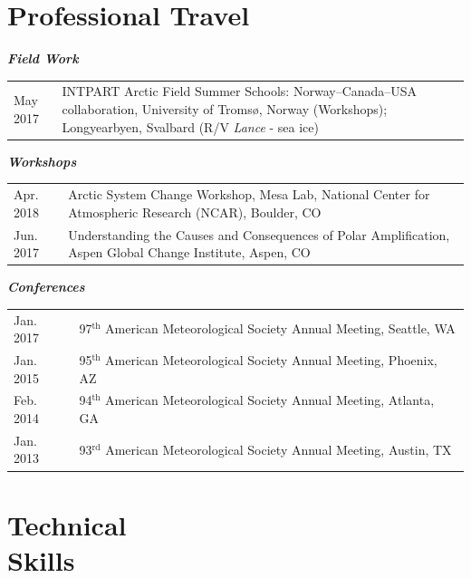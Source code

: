 \documentclass[margin,line,palatino,courier,10pt]{res}
\begin{document}
\begin{resume}
\section{\sc \textcolor{Cerulean}{\large{\textbf{Professional Travel}}}}
\textit{\textbf{Field Work}}
\vspace*{0.05in}\\
\begin{tabular}{@{}p{0.9in}p{4in}}
May 2017 & INTPART Arctic Field Summer Schools: Norway--Canada--USA collaboration, University of Troms\o, Norway (Workshops); Longyearbyen, Svalbard (R/V \textit{Lance} - sea ice)
\end{tabular}

\newpage
\textit{\textbf{Workshops}}
\vspace*{0.05in}\\
\begin{tabular}{@{}p{0.9in}p{4in}}
Apr. 2018 & Arctic System Change Workshop, Mesa Lab, National Center for Atmospheric Research (NCAR), Boulder, CO\\
Jun. 2017 & Understanding the Causes and Consequences of Polar Amplification, Aspen Global Change Institute, Aspen, CO
\end{tabular}

\textit{\textbf{Conferences}}
\vspace*{0.05in}\\
\begin{tabular}{@{}p{0.9in}p{4in}}
Jan. 2017 & 97$^\text{th} $ American Meteorological Society Annual Meeting, Seattle, WA \\
Jan. 2015 & 95$^\text{th} $ American Meteorological Society Annual Meeting, Phoenix, AZ \\
Feb. 2014 & 94$^\text{th} $ American Meteorological Society Annual Meeting, Atlanta, GA \\
Jan. 2013 & 93$^\text{rd} $ American Meteorological Society Annual Meeting, Austin, TX \\
\end{tabular}

\section{\sc \textcolor{Cerulean}{\large{\textbf{Technical \\ Skills}}}}
\vspace*{0.05in}
\begin{tabular}{@{}p{0.9in}p{6in}}


\end{tabular}
\end{resume}
\end{document}
